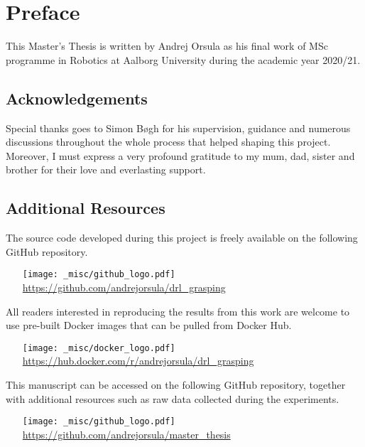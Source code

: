 \chapter*{Preface}

This Master’s Thesis is written by Andrej Orsula as his final work of MSc programme in Robotics at Aalborg University during the academic year 2020/21.


\section*{Acknowledgements}

Special thanks goes to Simon Bøgh for his supervision, guidance and numerous discussions throughout the whole process that helped shaping this project.
Moreover, I must express a very profound gratitude to my mum, dad, sister and brother for their love and everlasting support.


\section*{Additional Resources}

\noindent
The source code developed during this project is freely available on the following GitHub repository.
\vspace{-\topsep}
\begin{itemize}
    \item[{\texttt{[image: \_misc/github\_logo.pdf]}}] \href{https://github.com/andrejorsula/drl_grasping}{https://github.com/andrejorsula/drl\_grasping}
\end{itemize}
\vspace{0.5\topsep}

\noindent
All readers interested in reproducing the results from this work are welcome to use pre-built Docker images that can be pulled from Docker Hub.
\vspace{-\topsep}
\begin{itemize}
    \item[{\texttt{[image: \_misc/docker\_logo.pdf]}}] \href{https://hub.docker.com/r/andrejorsula/drl_grasping}{https://hub.docker.com/r/andrejorsula/drl\_grasping}
\end{itemize}
\vspace{0.5\topsep}

\noindent
This manuscript can be accessed on the following GitHub repository, together with additional resources such as raw data collected during the experiments.
\vspace{-\topsep}
\begin{itemize}
    \item[{\texttt{[image: \_misc/github\_logo.pdf]}}] \href{https://github.com/andrejorsula/master_thesis}{https://github.com/andrejorsula/master\_thesis}
\end{itemize}
\vspace{0.5\topsep}

